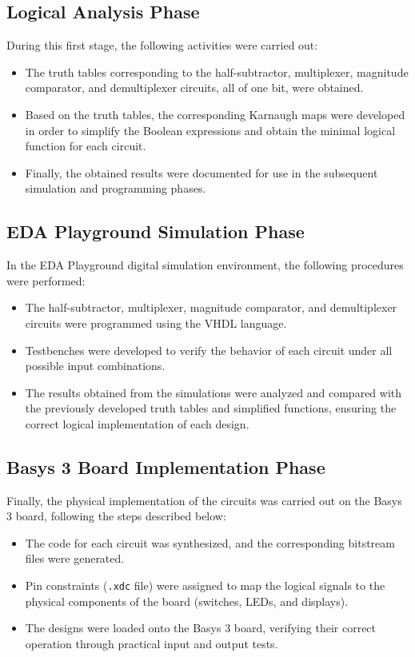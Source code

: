 \documentclass[12pt]{article}  %
\begin{document}
\subsection{Logical Analysis Phase}
During this first stage, the following activities were carried out:
\begin{itemize}
    \item The truth
        tables corresponding to the half-subtractor, multiplexer, magnitude
        comparator, and demultiplexer circuits, all of one bit, were obtained.
    \item Based on the
        truth tables, the corresponding Karnaugh maps were developed in order to
        simplify the Boolean expressions and obtain the minimal logical function
        for each circuit.
    \item Finally, the
        obtained results were documented for use in the subsequent simulation and
        programming phases.
\end{itemize}

\subsection{EDA Playground Simulation Phase}
In the EDA Playground digital simulation environment, the following
procedures were performed:
\begin{itemize}
    \item The
        half-subtractor, multiplexer, magnitude comparator, and demultiplexer
        circuits were programmed using the VHDL language.
    \item Testbenches
        were developed to verify the behavior of each circuit under all possible
        input combinations.
    \item The results
        obtained from the simulations were analyzed and compared with the
        previously developed truth tables and simplified functions, ensuring the
        correct logical implementation of each design.
\end{itemize}

\subsection{Basys 3 Board Implementation Phase}
Finally, the physical implementation of the circuits was carried out on
the Basys 3 board, following the steps described below:
\begin{itemize}
    \item The code for
        each circuit was synthesized, and the corresponding bitstream files were
        generated.
    \item Pin constraints
        (\texttt{.xdc} file) were assigned to map the logical signals to the physical
        components of the board (switches, LEDs, and displays).
    \item The designs
        were loaded onto the Basys 3 board, verifying their correct operation
        through practical input and output tests.
\end{itemize}
\end{document}
